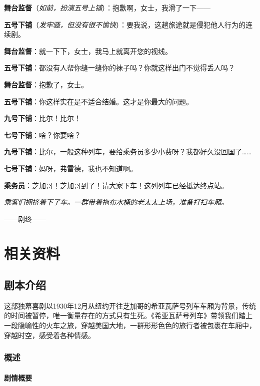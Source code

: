 \documentclass[lang=cn,newtx,12pt,scheme=chinese]{elegantbook}
\begin{document}
\textbf{舞台监督}（\textit{如前，扮演五号上铺}）：抱歉啊，女士，我滑了一下——

\textbf{五号下铺}（\textit{发牢骚，但没有很不愉快}）：要我说，这趟旅途就是侵犯他人行为的连续剧。

\textbf{舞台监督}：就一下下，女士，我马上就离开您的视线。

\textbf{五号下铺}：都没有人帮你缝一缝你的袜子吗？你就这样出门不觉得丢人吗？

\textbf{舞台监督}：抱歉了，女士。

\textbf{五号下铺}：你这样实在是不适合结婚。这才是你最大的问题。

\textbf{九号下铺}：比尔！比尔！

\textbf{七号下铺}：啥？你要啥？

\textbf{九号下铺}：比尔，一般这种列车，要给乘务员多少小费呀？我都好久没回国了……

\textbf{七号下铺}：妈呀，弗雷德，我也不知道啊。

\textbf{乘务员}：芝加哥！芝加哥到了！请大家下车！这列列车已经抵达终点站。

\textit{乘客们拥挤着下了车。一群带着拖布水桶的老太太上场，准备打扫车厢。}

——剧终——

\part{相关资料}

\chapter{剧本介绍}

这部独幕喜剧以1930年12月从纽约开往芝加哥的希亚瓦萨号列车车厢为背景，传统的时间被暂停，唯一衡量存在的方式只有生死。《希亚瓦萨号列车》带领我们踏上一段隐喻性的火车之旅，穿越美国大地，一群形形色色的旅行者被包裹在车厢中，穿越时空，感受着各种情感。

\section{概述}

\subsection{剧情概要}
\end{document}
